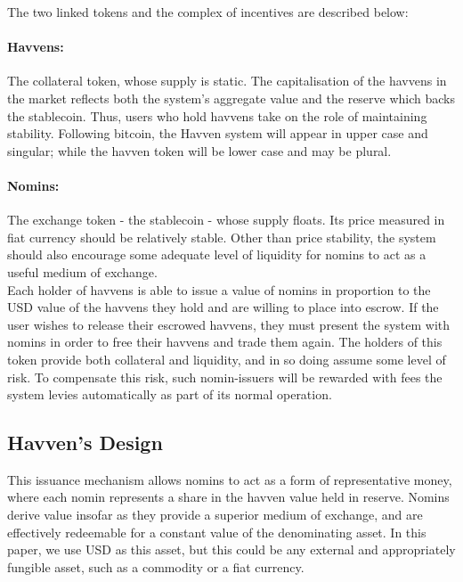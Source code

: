\noindent The two linked tokens and the complex of incentives are described below:

\paragraph{Havvens:} The collateral token, whose supply is static.
The capitalisation of the havvens in the market reflects both the system's aggregate value and the reserve
which backs the stablecoin. Thus, users who hold havvens take on the role of maintaining stability.
Following bitcoin, the Havven system will appear in upper case and singular; while the havven token will be lower case and may be plural.

\paragraph{Nomins:} The exchange token - the stablecoin - whose supply floats. Its price measured in fiat currency should be relatively stable.
Other than price stability, the system should also encourage some adequate level of liquidity for nomins
to act as a useful medium of exchange. \\

\noindent Each holder of havvens is able to issue a value of nomins in proportion to the USD value
of the havvens they hold and are willing to place into escrow. If the user wishes to release their escrowed havvens, they must
present the system with nomins in order to free their havvens and trade them again.
The holders of this token provide both collateral and liquidity, and in so doing assume some
level of risk. To compensate this risk, such nomin-issuers will be rewarded with fees the system levies
automatically as part of its normal operation. \\

\subsection{Havven's Design}

\noindent This issuance mechanism allows nomins to act as a form of representative money, where 
each nomin represents a share in the havven value held in reserve. Nomins derive value insofar as they provide
a superior medium of exchange, and are effectively redeemable for a constant value
of the denominating asset. In this paper, we use USD as this asset, but this could be any external
and appropriately fungible asset, such as a commodity or a fiat currency.  \\

